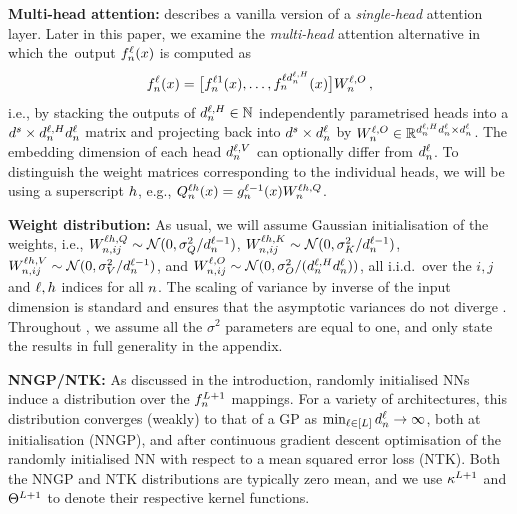 \documentclass{article}
\begin{document}
\textbf{Multi-head attention:}  describes a vanilla version of a \emph{single-head} attention layer.
Later in this paper, we examine the \emph{multi-head} attention alternative in which the~output ${f}^{\ell}_{n}{(x)}$ is computed as
\begin{equation}\label{eq:attention_out}
    {f}^{
    \ell
    }_{n}{(x)}
    =
    \bigl[
        {f}^{
        \ell
        1}_{n}{(x)},
        \ldots,
        {f}^{
        \ell
        d_{n}^{\ell, H}}_{n}{(x)}
    \bigr]
    W_{n}^{\ell, O}
    \, ,
\end{equation}
i.e., by stacking the outputs of $d_{n}^{\ell, H} \in \mathbb{N}$ independently parametrised heads into a $d^s \times d_{n}^{\ell, H} d_{n}^{\ell}$ matrix and projecting back into $d^s \times d_{n}^{\ell}$ by $W_{n}^{\ell, O} \in \mathbb{R}^{d_{n}^{\ell, H} d_{n}^{\ell} \times d_{n}^{\ell}}$.
The embedding dimension of each head $d_{n}^{\ell, V}$ can optionally differ from $d_{n}^{\ell}$.
To distinguish the weight matrices corresponding to the individual heads, we will be using a superscript $h$, e.g., 
$Q_{n}^{\ell h} (x) = {g}^{\ell - 1}_{n}{(x)} W_{n}^{\ell h, Q}$.


\textbf{Weight distribution:} 
As usual, we will assume Gaussian initialisation of the weights, i.e., 
$W_{n, ij}^{\ell h, Q} \sim \mathcal{N} (0, \sigma_{Q}^2 / d_{n}^{\ell - 1} )$, 
$W_{n, ij}^{\ell h, K} \sim \mathcal{N} (0, \sigma_{K}^2 / d_{n}^{\ell - 1} )$,
$W_{n, ij}^{\ell h, V} \sim \mathcal{N} (0, \sigma_{V}^2 / d_{n}^{\ell - 1} )$, 
and
$W_{n, ij}^{\ell, O} \sim \mathcal{N} (0, \sigma_{O}^2 / (d_{n}^{\ell, H} d_{n}^{\ell}) )$, all i.i.d.\ over the $i, j$ and $\ell, h$ indices for all $n$.
The scaling of variance by inverse of the input dimension is standard and ensures that the asymptotic variances do not diverge \citep{neal1996,lecun1998efficient,he2015delving}.
Throughout , we assume all the $\sigma^2$ parameters are equal to one, and only state the results in full generality in the appendix.


\textbf{NNGP/NTK:} 
As discussed in the introduction, randomly initialised NNs induce a distribution over the $f_{n}^{L + 1}$ mappings.
For a variety of architectures, this distribution converges (weakly) to that of a GP as $\min_{\ell \in [L]} d_{n}^{\ell} \to \infty$, both at initialisation (NNGP), and after continuous gradient descent optimisation of the randomly initialised NN
with respect to a mean squared error loss (NTK).
Both the NNGP and NTK distributions are typically zero mean, and we use $\kappa^{L + 1}$ and $\Theta^{L + 1}$ to denote their respective kernel functions.
\end{document}
